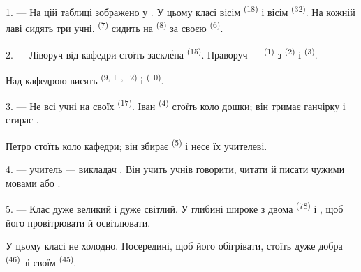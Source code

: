 \VUsaut{2.0mm}
\VUsaut{3.2mm}
\VUsaut{2.6mm}
\VUsaut{3.4mm}
\VUornamento{9pt}
\VUsaut{5.0mm}
\VUsaut{3.0mm}
\VUfilet{16mm}
\VUsaut{5.6mm}

\VUsaut{1.4mm}
\VUsaut{2.2mm}
\VUfilet{20mm}
\VUsaut{6.4mm}

\VUsaut{3.0mm}

1. --- На цій таблиці зображено  у . У цьому класі
вісім  \textsuperscript{(18)} і вісім 
\textsuperscript{(32)}. На кожній лаві сидять три учні. 
\textsuperscript{(7)} сидить на  \textsuperscript{(8)} за своєю
 \textsuperscript{(6)}.

2. --- Ліворуч від кафедри стоїть заскле́на  \textsuperscript{(15)}.
Праворуч ---  \textsuperscript{(1)} з 
\textsuperscript{(2)} і  \textsuperscript{(3)}.

Над кафедрою висять  \textsuperscript{(9, 11, 12)} і
 \textsuperscript{(10)}.

3. --- Не всі учні на своїх  \textsuperscript{(17)}. Іван
\textsuperscript{(4)} стоїть коло дошки; він тримає ганчірку і стирає
.

Петро стоїть коло кафедри; він збирає 
\textsuperscript{(5)} і несе їх учителеві.

4. ---  учитель --- викладач . Він учить учнів
говорити, читати й писати чужими мовами  або .

5. --- Клас дуже великий і дуже світлий. У глибині широке  з
двома  \textsuperscript{(78)} і , щоб
його провітрювати й освітлювати.

У цьому класі не холодно. Посередині, щоб його обігрівати, стоїть дуже добра
 \textsuperscript{(46)} зі своїм 
\textsuperscript{(45)}.

